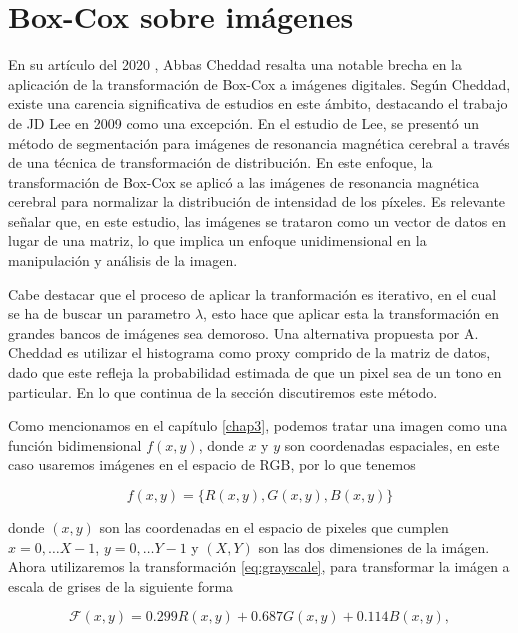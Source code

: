     \section{Box-Cox sobre im\'agenes} 

    En su art\'iculo del 2020 \cite{boxcoximg}, Abbas Cheddad resalta una notable brecha en la aplicaci\'on de la transformaci\'on de Box-Cox a im\'agenes digitales. Seg\'un Cheddad, existe una carencia significativa de estudios en este \'ambito, destacando el trabajo de JD Lee en 2009 como una excepci\'on\cite{lee2009mr}. En el estudio de Lee, se present\'o un m\'etodo de segmentaci\'on para im\'agenes de resonancia magn\'etica cerebral a trav\'es de una t\'ecnica de transformaci\'on de distribuci\'on. En este enfoque, la transformaci\'on de Box-Cox se aplic\'o a las im\'agenes de resonancia magn\'etica cerebral para normalizar la distribuci\'on de intensidad de los p\'ixeles. Es relevante se\~nalar que, en este estudio, las im\'agenes se trataron como un vector de datos en lugar de una matriz, lo que implica un enfoque unidimensional en la manipulaci\'on y an\'alisis de la imagen.

    Cabe destacar que el proceso de aplicar la tranformaci\'on es iterativo, en el cual se ha de buscar un parametro $\lambda$, esto hace que aplicar esta la transformaci\'on en grandes bancos de im\'agenes sea demoroso. Una alternativa propuesta por A. Cheddad \cite{boxcoximg} es utilizar el histograma como proxy comprido de la matriz de datos, dado que este refleja la probabilidad estimada de que un pixel sea de un tono en particular. En lo que continua de la secci\'on discutiremos este m\'etodo.

    Como mencionamos en el cap\'itulo \ref{chap3}, podemos tratar una imagen como una funci\'on bidimensional $f(x,y)$, donde $x$ y $y$ son coordenadas espaciales, en este caso usaremos im\'agenes en el espacio de RGB, por lo que tenemos 
    
    $$
    f(x, y)=\{R(x, y), G(x, y), B(x, y)\}
    $$

    donde $(x, y)$ son las coordenadas en el espacio de pixeles que cumplen $x=0, \ldots X-1$, $y=0, \ldots Y-1$ y $(X, Y)$ son las dos dimensiones de la im\'agen. Ahora utilizaremos la transformaci\'on \ref{eq:grayscale}, para transformar la im\'agen a escala de grises de la siguiente forma

    \begin{equation*}
        \mathcal{F}(x, y)=0.299 R(x, y)+0.687 G(x, y)+0.114 B(x, y), 
    \end{equation*}

